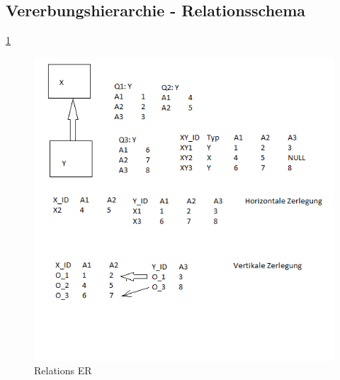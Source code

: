 \subsection{Vererbungshierarchie - Relationsschema }
\ref{img:Vererbungshierarchie}
\begin{figure}
	\centering
	\includegraphics[width = 16cm]{./Database/Images/2_4.png}
	\caption{Relations ER}
	\label{img:Vererbungshierarchie}
\end{figure}